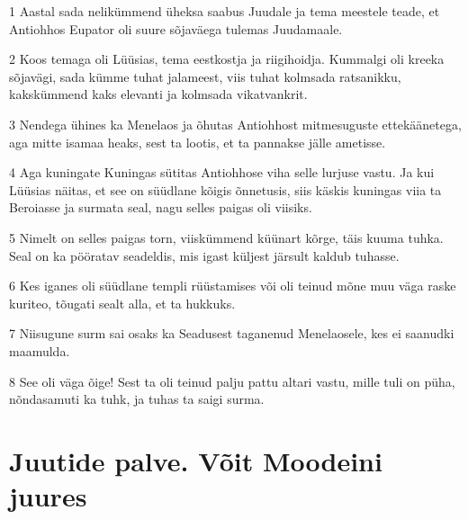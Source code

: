 \par 1 Aastal sada nelikümmend üheksa saabus Juudale ja tema meestele teade, et Antiohhos Eupator oli suure sõjaväega tulemas Juudamaale.
\par 2 Koos temaga oli Lüüsias, tema eestkostja ja riigihoidja. Kummalgi oli kreeka sõjavägi, sada kümme tuhat jalameest, viis tuhat kolmsada ratsanikku, kakskümmend kaks elevanti ja kolmsada vikatvankrit.
\par 3 Nendega ühines ka Menelaos ja õhutas Antiohhost mitmesuguste ettekäänetega, aga mitte isamaa heaks, sest ta lootis, et ta pannakse jälle ametisse.
\par 4 Aga kuningate Kuningas sütitas Antiohhose viha selle lurjuse vastu. Ja kui Lüüsias näitas, et see on süüdlane kõigis õnnetusis, siis käskis kuningas viia ta Beroiasse ja surmata seal, nagu selles paigas oli viisiks.
\par 5 Nimelt on selles paigas torn, viiskümmend küünart kõrge, täis kuuma tuhka. Seal on ka pööratav seadeldis, mis igast küljest järsult kaldub tuhasse.
\par 6 Kes iganes oli süüdlane templi rüüstamises või oli teinud mõne muu väga raske kuriteo, tõugati sealt alla, et ta hukkuks.
\par 7 Niisugune surm sai osaks ka Seadusest taganenud Menelaosele, kes ei saanudki maamulda.
\par 8 See oli väga õige! Sest ta oli teinud palju pattu altari vastu, mille tuli on püha, nõndasamuti ka tuhk, ja tuhas ta saigi surma.


\section*{Juutide palve. Võit Moodeini juures}

